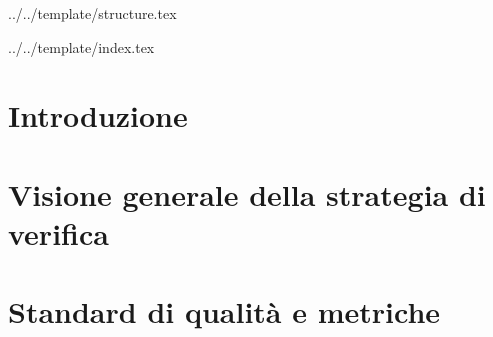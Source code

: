 


\def\DOCUMENTO{Piano di Qualifica}
\def\VERSIONE{3.0.0}

\def\REDATTORE {Burlin Valerio\\ & Carraro Nicola}
\def\VERIFICATORE {Crespan Emanuele}
\def\RESPONSABILE {Suierica Bogdan}

\def\USO {Esterno}

\def\DISTRIBUZIONE {\GRUPPO{}\\ & \COMMITTENTE{}\\ & \PROPONENTE{}\\}

\def\DESCRIZIONE {Documento riguardante le strategie di verifica e validazione adottate dal gruppo \GRUPPO\ necessarie ad assicurare i requisiti qualitativi nello svolgimento del progetto \PROGETTO.}


\def\INDICE	{true}
\def\TABELLE {true}
\def\FIGURE {true}


 {../../template/structure.tex}



 {../../template/index.tex}



%

\section{Introduzione}



\newpage
\section{Visione generale della strategia di verifica}


\newpage
\section{Standard di qualità e metriche}


